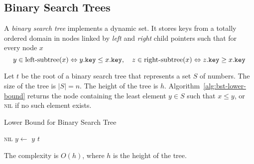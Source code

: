 \subsection{Binary Search Trees}
\label{subsec:bst}

\begin{definition}
A \emph{binary search tree} implements a dynamic set. It stores keys from a totally ordered domain in nodes linked by \emph{left} and \emph{right} child pointers such that for every node \(x\)
\[
y\in\text{left-subtree}(x) \Leftrightarrow  \attrib{y}{key}\le\attrib{x}{key}
,\quad
z\in\text{right-subtree}(x)\Leftrightarrow  \attrib{z}{key}\ge\attrib{x}{key}%
\]
\end{definition}





\begin{example}
  Let $t$ be the root of a binary search tree that represents a set $S$ of numbers. 
  The size of the tree is $|S|=n$. 
  The height of the tree is $h$. Algorithm~\ref{alg:bst-lower-bound} returns the node containing the least element $y \in S$ such that $x \leq y$, or \textsc{nil} if no such element exists.
  
  \begin{algorithm}[htb]
    \caption{Lower Bound for Binary Search Tree}
    \label{alg:bst-lower-bound}
    \begin{algorithmic}[1]
       
      \State \Return \textsc{nil}
      \EndIf
      \State \Return {}
      \Else
      \State $y \gets $ 
      \State \Return $y$
      \Else
      \State \Return $t$
      \EndIf
      \EndIf
      \EndFunction
    \end{algorithmic}
  \end{algorithm}
  \FloatBarrier
  The complexity is $O(h)$, where $h$ is the height of the tree. 
  \end{example}
  


